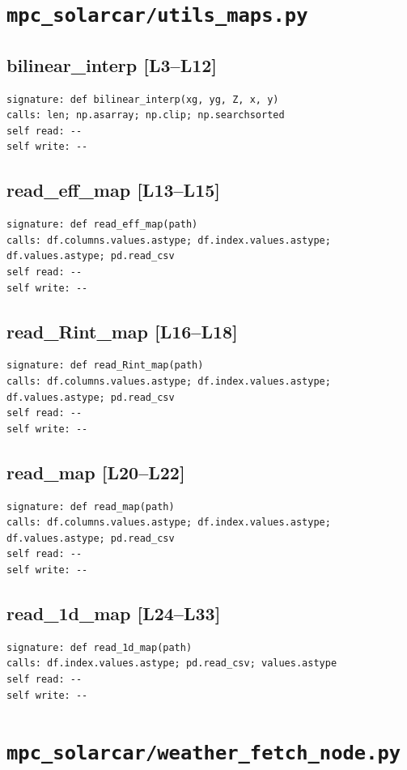 \documentclass[a4paper,10pt,oneside]{book}
\begin{document}
\section{\texttt{mpc\_solarcar/utils\_maps.py}}
\subsection*{bilinear\_interp [L3--L12]}
\begin{lstlisting}[numbers=none]
signature: def bilinear_interp(xg, yg, Z, x, y)
calls: len; np.asarray; np.clip; np.searchsorted
self read: --
self write: --
\end{lstlisting}
\subsection*{read\_eff\_map [L13--L15]}
\begin{lstlisting}[numbers=none]
signature: def read_eff_map(path)
calls: df.columns.values.astype; df.index.values.astype; df.values.astype; pd.read_csv
self read: --
self write: --
\end{lstlisting}
\subsection*{read\_Rint\_map [L16--L18]}
\begin{lstlisting}[numbers=none]
signature: def read_Rint_map(path)
calls: df.columns.values.astype; df.index.values.astype; df.values.astype; pd.read_csv
self read: --
self write: --
\end{lstlisting}
\subsection*{read\_map [L20--L22]}
\begin{lstlisting}[numbers=none]
signature: def read_map(path)
calls: df.columns.values.astype; df.index.values.astype; df.values.astype; pd.read_csv
self read: --
self write: --
\end{lstlisting}
\subsection*{read\_1d\_map [L24--L33]}
\begin{lstlisting}[numbers=none]
signature: def read_1d_map(path)
calls: df.index.values.astype; pd.read_csv; values.astype
self read: --
self write: --
\end{lstlisting}
\section{\texttt{mpc\_solarcar/weather\_fetch\_node.py}}
\end{document}
